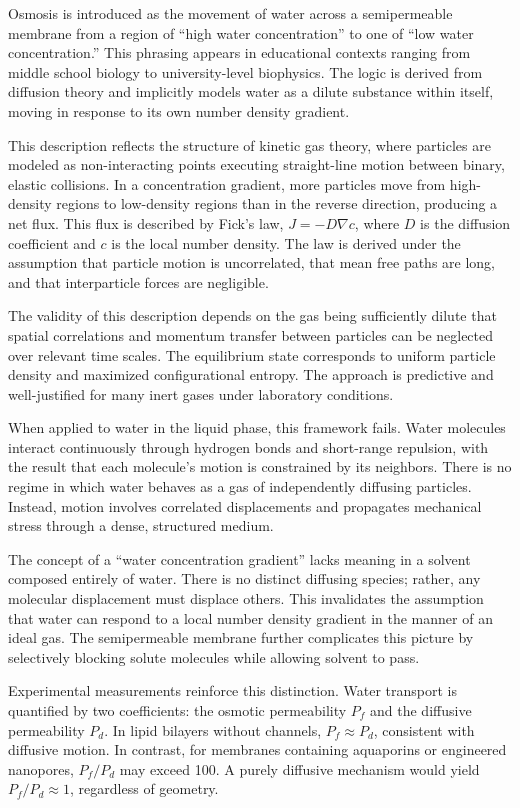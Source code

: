 Osmosis is introduced as the movement of water across a semipermeable membrane from a region of “high water concentration” to one of “low water concentration.” This phrasing appears in educational contexts ranging from middle school biology to university-level biophysics. The logic is derived from diffusion theory and implicitly models water as a dilute substance within itself, moving in response to its own number density gradient.

This description reflects the structure of kinetic gas theory, where particles are modeled as non-interacting points executing straight-line motion between binary, elastic collisions. In a concentration gradient, more particles move from high-density regions to low-density regions than in the reverse direction, producing a net flux. This flux is described by Fick’s law, $J = -D \nabla c$, where $D$ is the diffusion coefficient and $c$ is the local number density. The law is derived under the assumption that particle motion is uncorrelated, that mean free paths are long, and that interparticle forces are negligible.

The validity of this description depends on the gas being sufficiently dilute that spatial correlations and momentum transfer between particles can be neglected over relevant time scales. The equilibrium state corresponds to uniform particle density and maximized configurational entropy. The approach is predictive and well-justified for many inert gases under laboratory conditions.

When applied to water in the liquid phase, this framework fails. Water molecules interact continuously through hydrogen bonds and short-range repulsion, with the result that each molecule’s motion is constrained by its neighbors. There is no regime in which water behaves as a gas of independently diffusing particles. Instead, motion involves correlated displacements and propagates mechanical stress through a dense, structured medium.

The concept of a “water concentration gradient” lacks meaning in a solvent composed entirely of water. There is no distinct diffusing species; rather, any molecular displacement must displace others. This invalidates the assumption that water can respond to a local number density gradient in the manner of an ideal gas. The semipermeable membrane further complicates this picture by selectively blocking solute molecules while allowing solvent to pass.

Experimental measurements reinforce this distinction. Water transport is quantified by two coefficients: the osmotic permeability $P_f$ and the diffusive permeability $P_d$. In lipid bilayers without channels, $P_f \approx P_d$, consistent with diffusive motion. In contrast, for membranes containing aquaporins or engineered nanopores, $P_f / P_d$ may exceed 100. A purely diffusive mechanism would yield $P_f / P_d \approx 1$, regardless of geometry.

